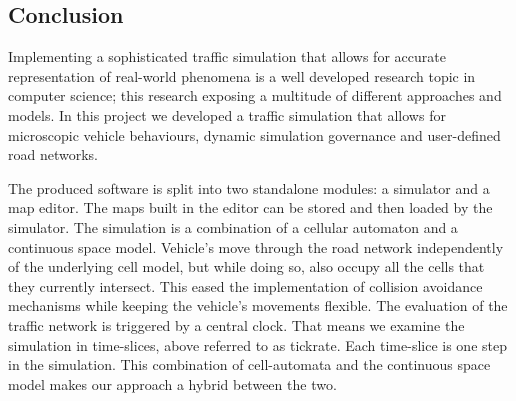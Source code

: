 \subsection*{Conclusion}
Implementing a sophisticated traffic simulation that allows for accurate representation of real-world phenomena is a well developed research topic in computer science; this research exposing a multitude of different approaches and models. In this project we developed a traffic simulation that allows for microscopic vehicle behaviours, dynamic simulation governance and user-defined road networks. 

The produced software is split into two standalone modules: a simulator and a map editor. The maps built in the editor can be stored and then loaded by the simulator. The simulation is a combination of a cellular automaton and a continuous space model. Vehicle's move through the road network independently of the underlying cell model, but while doing so, also occupy all the cells that they currently intersect. This eased the implementation of collision avoidance mechanisms while keeping the vehicle's movements flexible. The evaluation of the traffic network is triggered by a central clock. That means we examine the simulation in time-slices, above referred to as tickrate. Each time-slice is one step in the simulation. This combination of cell-automata and the continuous space model makes our approach a hybrid between the two.
\clearpage
